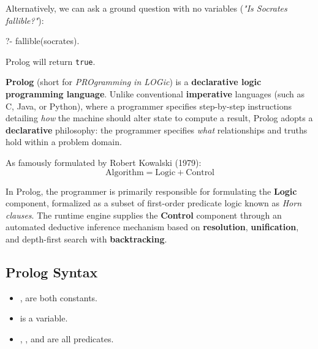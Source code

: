 \begin{example}{}
Alternatively, we can ask a ground question with no variables (\textit{"Is Socrates fallible?"}):
\begin{codeblock}
?- fallible(socrates).
\end{codeblock}
Prolog will return \texttt{true}.
\end{example}

\textbf{Prolog} (short for \textit{PROgramming in LOGic}) is a \textbf{declarative logic programming language}. Unlike conventional \textbf{imperative} languages (such as C, Java, or Python), where a programmer specifies step-by-step instructions detailing \textit{how} the machine should alter state to compute a result, Prolog adopts a \textbf{declarative} philosophy: the programmer specifies \textit{what} relationships and truths hold within a problem domain.

As famously formulated by Robert Kowalski (1979):
\[
\text{Algorithm} = \text{Logic} + \text{Control}
\]

In Prolog, the programmer is primarily responsible for formulating the \textbf{Logic} component, formalized as a subset of first-order predicate logic known as \textit{Horn clauses}. The runtime engine supplies the \textbf{Control} component through an automated deductive inference mechanism based on \textbf{resolution}, \textbf{unification}, and depth-first search with \textbf{backtracking}.

\subsection{Prolog Syntax}


\begin{example}{}
\begin{itemize}
    \item {},  are both constants.
    \item {} is a variable.
    \item {}, , and  are all predicates.
\end{itemize}


    
\end{example}


